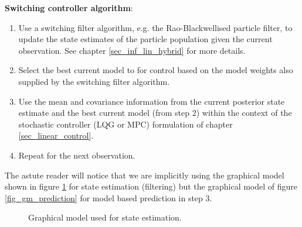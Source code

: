 \textbf{Switching controller algorithm}:
\begin{enumerate}
\item
Use a switching filter algorithm, e.g. the Rao-Blackwellised particle filter, to update the state estimates of the particle population given the current observation. See chapter \ref{sec_inf_lin_hybrid} for more details.
\item
Select the best current model to for control based on the model weights also supplied by the switching filter algorithm.
\item
Use the mean and covariance information from the current posterior state estimate and the best current model (from step 2) within the context of the stochastic controller (LQG or MPC) formulation of chapter \ref{sec_linear_control}.
\item
Repeat for the next observation. 
\end{enumerate} 
The astute reader will notice that we are implicitly using the graphical model shown in figure \ref{fig_gm_filter} for state estimation (filtering) but the graphical model of figure \ref{fig_gm_prediction} for model based prediction in step 3.
\begin{figure}[H] 
\centering
{}
\caption{Graphical model used for state estimation.}
\label{fig_gm_filter}
\end{figure}
